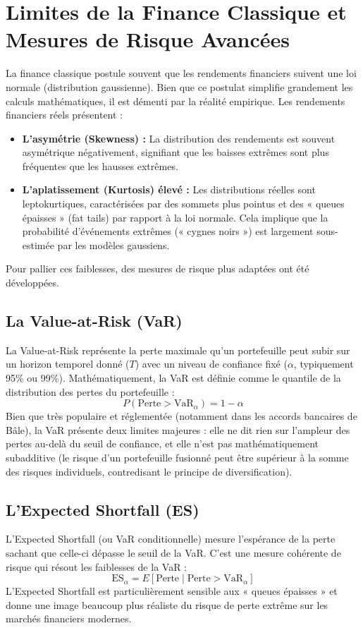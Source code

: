 \section{Limites de la Finance Classique et Mesures de Risque Avancées}
La finance classique postule souvent que les rendements financiers suivent une loi normale (distribution gaussienne). Bien que ce postulat simplifie grandement les calculs mathématiques, il est démenti par la réalité empirique. Les rendements financiers réels présentent :
\begin{itemize}
    \item \textbf{L'asymétrie (Skewness) :} La distribution des rendements est souvent asymétrique négativement, signifiant que les baisses extrêmes sont plus fréquentes que les hausses extrêmes.
    \item \textbf{L'aplatissement (Kurtosis) élevé :} Les distributions réelles sont leptokurtiques, caractérisées par des sommets plus pointus et des « queues épaisses » (fat tails) par rapport à la loi normale. Cela implique que la probabilité d'événements extrêmes (« cygnes noirs ») est largement sous-estimée par les modèles gaussiens.
\end{itemize}

Pour pallier ces faiblesses, des mesures de risque plus adaptées ont été développées.

\subsection{La Value-at-Risk (VaR)}
La Value-at-Risk représente la perte maximale qu'un portefeuille peut subir sur un horizon temporel donné ($T$) avec un niveau de confiance fixé ($\alpha$, typiquement 95\% ou 99\%). Mathématiquement, la VaR est définie comme le quantile de la distribution des pertes du portefeuille :
\begin{equation}
    P(\text{Perte} > \text{VaR}_{\alpha}) = 1 - \alpha
\end{equation}
Bien que très populaire et réglementée (notamment dans les accords bancaires de Bâle), la VaR présente deux limites majeures : elle ne dit rien sur l'ampleur des pertes au-delà du seuil de confiance, et elle n'est pas mathématiquement subadditive (le risque d'un portefeuille fusionné peut être supérieur à la somme des risques individuels, contredisant le principe de diversification).

\subsection{L'Expected Shortfall (ES)}
L'Expected Shortfall (ou VaR conditionnelle) mesure l'espérance de la perte sachant que celle-ci dépasse le seuil de la VaR. C'est une mesure cohérente de risque qui résout les faiblesses de la VaR :
\begin{equation}
    \text{ES}_{\alpha} = E[\text{Perte} \mid \text{Perte} > \text{VaR}_{\alpha}]
\end{equation}
L'Expected Shortfall est particulièrement sensible aux « queues épaisses » et donne une image beaucoup plus réaliste du risque de perte extrême sur les marchés financiers modernes.

